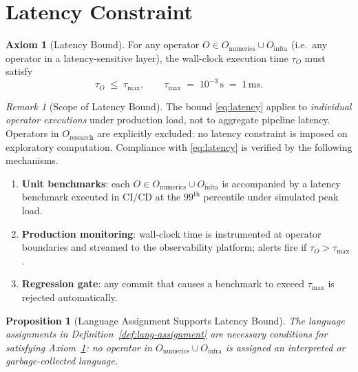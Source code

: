 \documentclass[12pt,openany]{book}
\numberwithin{equation}{chapter}
\theoremstyle{plain}
\newtheorem{proposition}[theorem]{Proposition}
\theoremstyle{definition}
\newtheorem{axiom}[theorem]{Axiom}
\theoremstyle{remark}
\newtheorem{remark}[theorem]{Remark}
\numberwithin{equation}{chapter}
\theoremstyle{plain}
\newcommand{\calO}{\mathcal{O}}
\def\calO{O}%
\begin{document}
\section{Latency Constraint}
\label{sec:lang-latency}

\begin{axiom}[Latency Bound]
\label{ax:latency}
For any operator $O \in \calO_{\text{numerics}} \cup \calO_{\text{infra}}$
(i.e.\ any operator in a latency-sensitive layer), the wall-clock
execution time $\tau_O$ must satisfy
\begin{equation}
  \tau_O \;\leq\; \tau_{\max},
  \qquad
  \tau_{\max} \;=\; 10^{-3}\,\text{s}
  \;=\; 1\,\text{ms}.
  \label{eq:latency}
\end{equation}
\end{axiom}

\begin{remark}[Scope of Latency Bound]
\label{rem:latency-scope}
The bound \eqref{eq:latency} applies to \emph{individual operator
executions} under production load, not to aggregate pipeline latency.
Operators in $\calO_{\text{research}}$ are explicitly excluded: no
latency constraint is imposed on exploratory computation.
Compliance with \eqref{eq:latency} is verified by the following
mechanisms.
\begin{enumerate}
  \item \textbf{Unit benchmarks}: each $O \in
        \calO_{\text{numerics}} \cup \calO_{\text{infra}}$ is
        accompanied by a latency benchmark executed in CI/CD at the
        $99^{\text{th}}$ percentile under simulated peak load.
  \item \textbf{Production monitoring}: wall-clock time is instrumented
        at operator boundaries and streamed to the observability
        platform; alerts fire if $\tau_O > \tau_{\max}$.
  \item \textbf{Regression gate}: any commit that causes a benchmark to
        exceed $\tau_{\max}$ is rejected automatically.
\end{enumerate}
\end{remark}

\begin{proposition}[Language Assignment Supports Latency Bound]
\label{prop:lang-latency}
The language assignments in Definition~\ref{def:lang-assignment} are
\emph{necessary conditions} for satisfying Axiom~\ref{ax:latency}:
no operator in $\calO_{\text{numerics}} \cup \calO_{\text{infra}}$ is
assigned an interpreted or garbage-collected language.
\end{proposition}
\end{document}
